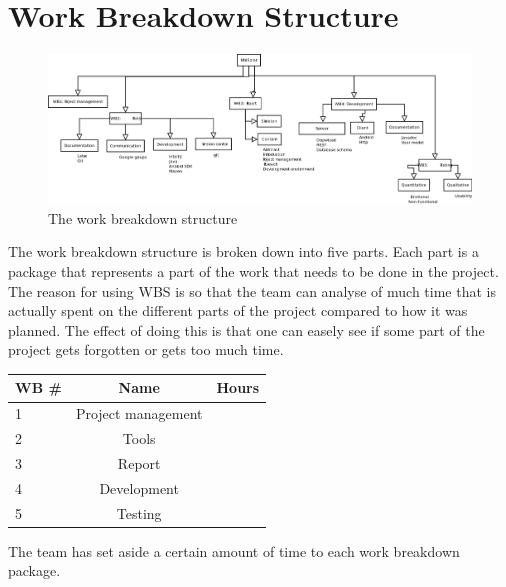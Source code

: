 \section{Work Breakdown Structure}

\begin{figure}[H]
\includegraphics[width=\textwidth]{ch/projectPlan/fig/WBS.png}
\caption{The work breakdown structure}
\end{figure}

The work breakdown structure is broken down into five parts. Each part is a package that represents a part of the work that needs to be done in the project.
The reason for using WBS is so that the team can analyse of much time that is actually spent on the different parts of the project compared to how it was planned.
The effect of doing this is that one can easely see if some part of the project gets forgotten or gets too much time.

\begin{table}[H]
\centering
{}
\begin{tabular}{l c r}
    \textbf{WB \#} & \textbf{Name} & \textbf{Hours} \\\hline
    1 & Project management & \\\hline
    2 & Tools & \\\hline
    3 & Report & \\\hline
    4 & Development & \\\hline
    5 & Testing  & \\\hline
\end{tabular}
\end{table}

The team has set aside a certain amount of time to each work breakdown package.
